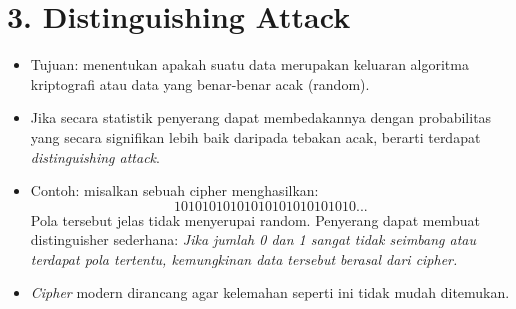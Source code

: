 \documentclass{article}
\begin{document}

\section*{3. Distinguishing Attack}

\begin{itemize}
    \item Tujuan: menentukan apakah suatu data merupakan keluaran algoritma kriptografi atau data yang benar-benar acak (random).
    \item Jika secara statistik penyerang dapat membedakannya dengan probabilitas yang secara signifikan lebih baik daripada tebakan acak, berarti terdapat \textit{distinguishing attack}.
    \vspace{5mm}
    \item Contoh: misalkan sebuah cipher menghasilkan:
    \[ 10101010101010101010101010... \]
    Pola tersebut jelas tidak menyerupai random.
    Penyerang dapat membuat distinguisher sederhana:
    \textit{Jika jumlah 0 dan 1 sangat tidak seimbang atau terdapat pola tertentu, kemungkinan data tersebut berasal dari cipher.}
    \vspace{5mm}
    \item \textit{Cipher} modern dirancang agar kelemahan seperti ini tidak mudah ditemukan.
\end{itemize}
\end{document}
